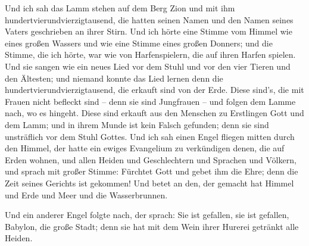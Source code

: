  Und ich sah das Lamm stehen auf dem Berg Zion und mit ihm
hundertvierundvierzigtausend, die hatten seinen Namen und den Namen
seines Vaters geschrieben an ihrer Stirn.  Und ich hörte
eine Stimme vom Himmel wie eines großen Wassers und wie eine Stimme
eines großen Donners; und die Stimme, die ich hörte, war wie von
Harfenspielern, die auf ihren Harfen spielen.  Und sie
sangen wie ein neues Lied vor dem Stuhl und vor den vier Tieren und den
Ältesten; und niemand konnte das Lied lernen denn die
hundertvierundvierzigtausend, die erkauft sind von der Erde.
 Diese sind's, die mit Frauen nicht befleckt sind -- denn
sie sind Jungfrauen -- und folgen dem Lamme nach, wo es hingeht. Diese
sind erkauft aus den Menschen zu Erstlingen Gott und dem Lamm;
 und in ihrem Munde ist kein Falsch gefunden; denn sie
sind unsträflich vor dem Stuhl Gottes.  Und ich sah einen
Engel fliegen mitten durch den Himmel, der hatte ein ewiges Evangelium
zu verkündigen denen, die auf Erden wohnen, und allen Heiden und
Geschlechtern und Sprachen und Völkern,  und sprach mit
großer Stimme: Fürchtet Gott und gebet ihm die Ehre; denn die Zeit
seines Gerichts ist gekommen! Und betet an den, der gemacht hat Himmel
und Erde und Meer und die Wasserbrunnen.

 Und ein anderer Engel folgte nach, der sprach: Sie ist
gefallen, sie ist gefallen, Babylon, die große Stadt; denn sie hat mit
dem Wein ihrer Hurerei getränkt alle Heiden.

